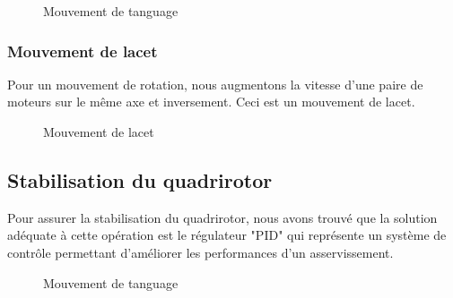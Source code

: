 	
	\begin{figure}[H] 
	\begin{center}
		\centering
	\end{center}
	\caption{Mouvement de tanguage}
	\end{figure}
	
	\subsubsection{Mouvement de lacet}
	Pour un mouvement de rotation, nous augmentons la vitesse d'une paire de moteurs sur le même axe et inversement. Ceci est un mouvement de lacet.
	\begin{figure} [H]
	\begin{center}
	\end{center}
	\caption{Mouvement de lacet}	
\end{figure}
\subsection {Stabilisation du quadrirotor}
Pour assurer la stabilisation du quadrirotor, nous avons trouvé que la solution adéquate à cette opération est le régulateur "PID" qui représente un système de contrôle permettant d’améliorer les performances d'un asservissement\cite{Wikipideab}.
	\begin{figure}[H] 
	\begin{center}
		\centering
	\end{center}
	\caption{Mouvement de tanguage}
\end{figure}

